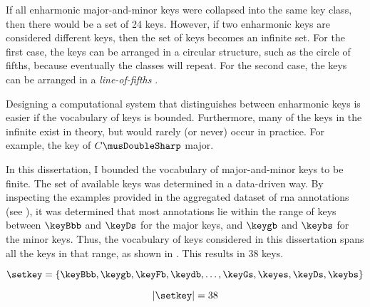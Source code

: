
If all enharmonic major-and-minor keys were collapsed into
the same key class, then there would be a set of 24 keys.
However, if two enharmonic keys are considered different
keys, then the set of keys becomes an infinite set. For the
first case, the keys can be arranged in a circular
structure, such as the circle of fifths, because eventually
the classes will repeat. For the second case, the keys can
be arranged in a \emph{line-of-fifths}
\parencite{temperley2000line}.

Designing a computational system that distinguishes between
enharmonic keys is easier if the vocabulary of keys is
bounded. Furthermore, many of the keys in the infinite exist
in theory, but would rarely (or never) occur in practice.
For example, the key of $C\musDoubleSharp$ major.

In this dissertation, I bounded the vocabulary of
major-and-minor keys to be finite. The set of available keys
was determined in a data-driven way. By inspecting the
examples provided in the aggregated dataset of \gls{rna}
annotations (see ),
it was determined that most annotations lie within the range
of keys between $\keyBbb$ and $\keyDs$ for the major keys,
and $\keygb$ and $\keybs$ for the minor keys. Thus, the
vocabulary of keys considered in this dissertation spans
all the keys in that range, as shown in . This results in 38 keys.

\begin{equation}
    \label{eq:keys}
    \setkey = \{ \keyBbb, \keygb, \keyFb, \keydb, \dotsc,
    \keyGs, \keyes, \keyDs, \keybs \}
\end{equation}

\begin{equation}
    | \setkey | = 38
\end{equation}
